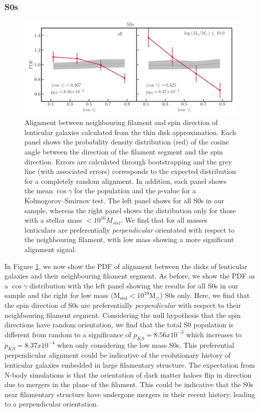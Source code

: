 \subsubsection{S0s}
\begin{figure}
    \centering
    \includegraphics[width=\linewidth]{thesis/latex/halo_assembly_manga/spin_fil_S0s_2in1.pdf}
    \caption{Alignment between neighbouring filament and spin direction of lenticular galaxies calculated from the thin disk approximation. Each panel shows the probability density distribution (red) of the cosine angle between the direction of the filament segment and the spin direction. Errors are calculated through bootstrapping and the grey line (with associated errors) corresponds to the expected distribution for a completely random alignment. In addition, each panel shows the mean $\cos \gamma$ for the population and the $p$-value for a Kolmogorov--Smirnov test. The left panel shows for all S0s in our sample, whereas the right panel shows the distribution only for those with a stellar mass $< 10^{10} M_{stel}$. We find that for all masses lenticulars are preferentially \textit{perpendicular} orientated with respect to the neighbouring filament, with low mass showing a more significant alignment signal.}
    \label{fig:s0_spin_alignment}
\end{figure}

In Figure \ref{fig:s0_spin_alignment}, we now show the PDF of alignment between the disks of lenticular galaxies and their neighbouring filament segment. As before, we show the PDF as a $\cos \gamma$ distribution with the left panel showing the results for all S0s in our sample and the right for low mass ($\mathrm{M_{stel} < 10^{10} M_{\odot}}$) S0s only. Here, we find that the spin direction of S0s are preferentially \textit{perpendicular} with respect to their neighbouring filament segment. Considering the null hypothesis that the spin directions have random orientation, we find that the total S0 population is different from random to a significance of $p_{KS} = 8.56 x 10^{-3}$ which increases to  $p_{KS} = 8.37 x 10^{-4}$ when only considering the low mass S0s. This preferential perpendicular alignment could be indicative of the evolutionary history of lenticular galaxies embedded in large filamentary structure. The expectation from N-body simulations is that the orientation of dark matter haloes flip in direction due to mergers in the plane of the filament. This could be indicative that the S0s near filamentary structure have undergone mergers in their recent history, leading to a perpendicular orientation. 

